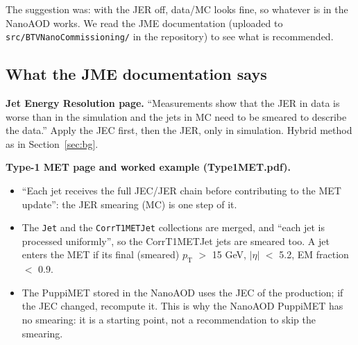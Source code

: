 \documentclass[11pt,a4paper]{article}
\newcommand{\pt}{$p_\mathrm{T}$}
\newcommand{\aeta}{$|\eta|$}
\begin{document}
The suggestion was: with the JER off, data/MC looks fine, so whatever is in the NanoAOD works. We read the JME documentation
(uploaded to \texttt{src/BTVNanoCommissioning/} in the repository) to see what is recommended.

\subsection{What the JME documentation says}
\textbf{Jet Energy Resolution page.} ``Measurements show that the JER in data is worse than in the simulation and the jets in MC
need to be smeared to describe the data.'' Apply the JEC first, then the JER, only in simulation. Hybrid method as in
Section~\ref{sec:bg}.

\textbf{Type-1 MET page and worked example (Type1MET.pdf).}
\begin{itemize}
\item ``Each jet receives the full JEC/JER chain before contributing to the MET update'': the JER smearing (MC) is one step of it.
\item The \texttt{Jet} and the \texttt{CorrT1METJet} collections are merged, and ``each jet is processed uniformly'', so the
CorrT1METJet jets are smeared too. A jet enters the MET if its final (smeared) \pt{} $>$ 15 GeV, \aeta{} $<$ 5.2, EM fraction $<$ 0.9.
\item The PuppiMET stored in the NanoAOD uses the JEC of the production; if the JEC changed, recompute it. This is why the
NanoAOD PuppiMET has no smearing: it is a starting point, not a recommendation to skip the smearing.
\end{itemize}
\end{document}
